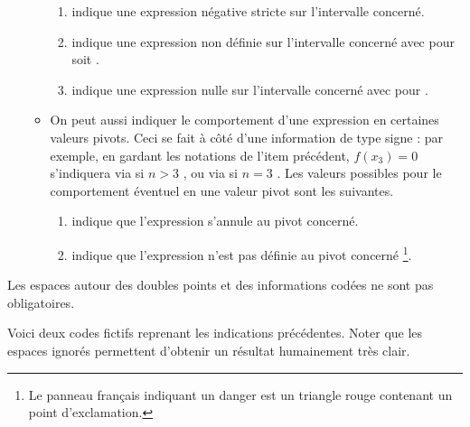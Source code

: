 \documentclass[10pt, a4paper]{article}
\begin{document}
\begin{enumerate}
\begin{itemize}
\begin{enumerate}
			\item \tdocinlatex{-} indique une expression négative stricte sur l'intervalle concerné.
			
			\item {} indique une expression non définie sur l'intervalle concerné avec  pour  soit 
.
	
			\item {} indique une expression nulle sur l'intervalle concerné avec  pour .
		\end{enumerate}

        
        \item On peut aussi indiquer le comportement d'une expression en certaines valeurs pivots. Ceci se fait à côté d'une information de type signe : par exemple, en gardant les notations de l'item précédent, $f(x_3) = 0$ s'indiquera via  si $n > 3$ , ou via  si $n = 3$ .
        Les valeurs possibles pour le comportement éventuel en une valeur pivot sont les suivantes.
		\begin{enumerate}
			\item {} indique que 
l'expression s'annule au pivot concerné.
			
			\item \tdocinlatex{!} indique que 
l'expression n'est pas définie au pivot concerné
        	\footnote{
        		Le panneau français indiquant un danger est un triangle rouge contenant un point d'exclamation.
			}.
		\end{enumerate}
    \end{itemize}
\end{enumerate}




\begin{tdocnote}
    Les espaces autour des doubles points et des informations codées ne sont pas obligatoires.
\end{tdocnote}




Voici deux codes fictifs reprenant les indications précédentes. Noter que les espaces ignorés permettent d'obtenir un résultat humainement très clair.
\begin{multicols}{2}

\end{multicols}
\end{document}
